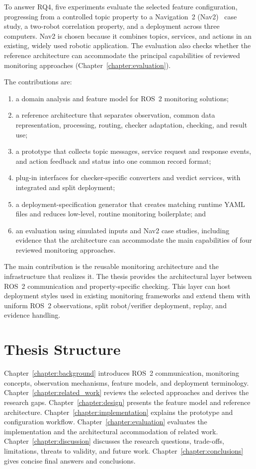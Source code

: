 To answer RQ4, five experiments evaluate the selected feature configuration,
progressing from a controlled topic property to a Navigation~2
(Nav2)~\cite{macenski2020marathon} case
study, a two-robot correlation property, and a deployment across three
computers. Nav2 is chosen because it combines topics, services, and actions in
an existing, widely used robotic application. The evaluation also checks
whether the reference architecture can accommodate the principal capabilities
of reviewed monitoring approaches (Chapter~\ref{chapter:evaluation}).

The contributions are:

\begin{enumerate}
  \item a domain analysis and feature model for ROS~2 monitoring
  solutions;
  \item a reference architecture that separates observation, common data
  representation, processing, routing, checker adaptation, checking, and
  result use;
  \item a prototype that collects topic messages, service request and response
  events, and action feedback and status into one common record format;
  \item plug-in interfaces for checker-specific converters and verdict
  services, with integrated and split deployment;
  \item a deployment-specification generator that creates matching runtime YAML
  files and reduces low-level, routine monitoring boilerplate; and
  \item an evaluation using simulated inputs and Nav2 case studies, including
  evidence that the architecture can accommodate the main capabilities of four
  reviewed monitoring approaches.
\end{enumerate}

The main contribution is the reusable monitoring architecture and the
infrastructure that realizes it. The thesis provides the architectural layer
between ROS~2 communication and property-specific checking. This layer can
host deployment styles used in existing monitoring frameworks and extend them
with uniform ROS~2 observations, split robot/verifier deployment, replay, and
evidence handling.

\section{Thesis Structure}

Chapter~\ref{chapter:background} introduces ROS~2 communication, monitoring
concepts, observation mechanisms, feature models, and deployment terminology.
Chapter~\ref{chapter:related_work} reviews the selected approaches and derives
the research gaps. Chapter~\ref{chapter:design} presents the feature model and
reference architecture. Chapter~\ref{chapter:implementation} explains the
prototype and configuration workflow. Chapter~\ref{chapter:evaluation}
evaluates the implementation and the architectural accommodation of related
work. Chapter~\ref{chapter:discussion} discusses the research questions,
trade-offs, limitations, threats to validity, and future work.
Chapter~\ref{chapter:conclusions} gives concise final answers and conclusions.
